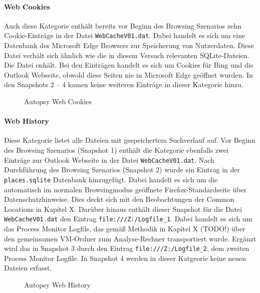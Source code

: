 \paragraph*{Web Cookies}
Auch diese Kategorie enthält bereits vor Beginn des Browsing Szenarios zehn Cookie-Einträge in der Datei \texttt{WebCacheV01.dat}. Dabei handelt es sich um eine Datenbank des Microsoft Edge Browsers zur Speicherung von Nutzerdaten. Diese Datei verhält sich ähnlich wie die in diesem Versuch relevanten SQLite-Dateien. Die Datei enhält. Bei den Einträgen handelt es sich um Cookies für Bing und die Outlook Webseite, obwohl diese Seiten nie in Microsoft Edge geöffnet wurden. In den Snapshots 2 -- 4 kamen keine weiteren Einträge in dieser Kategorie hinzu.
\begin{figure}[h!]
	\centerline{}
	\label{chart:final-criteria}  
	\caption{Autopsy Web Cookies}
\end{figure}

\paragraph*{Web History}
Diese Kategorie listet alle Dateien mit gespeichertem Suchverlauf auf. Vor Beginn des Browsing Szenarios (Snapshot 1) enthält die Kategorie ebenfalls zwei Einträge zur Outlook Webseite in der Datei \texttt{WebCacheV01.dat}. Nach Durchführung des Browsing Szenarios (Snapshot 2) wurde ein Eintrag in der \texttt{places.sqlite} Datenbank hinzugefügt. Dabei handelt es sich um die automatisch im normalen Browsingmodus geöffnete Firefox-Standardseite über Datenschutzhinweise. Dies deckt sich mit den Beobachtungen der Common Locations in Kapitel X. Darüber hinaus enthält dieser Snapshot für die Datei \texttt{WebCacheV01.dat} den Eintrag \texttt{file:///Z:/Logfile\_1}. Dabei handelt es sich um das Process Monitor Logfile, das gemäß Methodik in Kapitel X (TODO!) über den gemeinsamen VM-Ordner zum Analyse-Rechner transportiert wurde. Ergänzt wird das in Snapshot 3 durch den Eintrag \texttt{file:///Z:/Logfile\_2}, dem zweiten Process Monitor Logfile. In Snapshot 4 werden in dieser Katgeorie keine neuen Dateien erfasst.
\begin{figure}[h!]
	\centerline{}
	\label{chart:final-criteria}  
	\caption{Autopsy Web History}
\end{figure}

